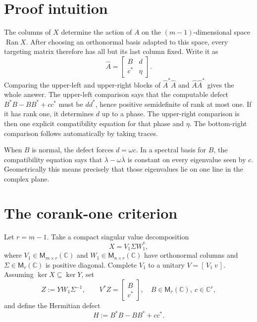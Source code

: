 \documentclass[11pt]{article}
\newcommand{\C}{\mathbb C}
\newcommand{\M}{\mathsf M}
\newcommand{\Ran}{\operatorname{Ran}}
\begin{document}
\section{Proof intuition}

The columns of $X$ determine the action of $A$ on the $(m-1)$-dimensional
space $\Ran X$.  After choosing an orthonormal basis adapted to this space,
every targeting matrix therefore has all but its last column fixed.  Write it
as
\[
 \widehat A=\begin{bmatrix}B&d\\ c^*&\eta\end{bmatrix}.
\]
Comparing the upper-left and upper-right blocks of
$\widehat A^*\widehat A$ and $\widehat A\widehat A^*$ gives the whole answer.
The upper-left comparison says that the computable defect
$B^*B-BB^*+cc^*$ must be $dd^*$, hence positive semidefinite of rank at most
one.  If it has rank one, it determines $d$ up to a phase.  The upper-right
comparison is then one explicit compatibility equation for that phase and
$\eta$.  The bottom-right comparison follows automatically by taking traces.

When $B$ is normal, the defect forces $d=\omega c$.  In a spectral basis for
$B$, the compatibility equation says that
$\lambda-\omega\overline\lambda$ is constant on every eigenvalue seen by
$c$.  Geometrically this means precisely that those eigenvalues lie on one
line in the complex plane.

\section{The corank-one criterion}

Let $r=m-1$.  Take a compact singular value decomposition
\[
 X=V_1\Sigma W_1^*,
\]
where $V_1\in\M_{m\times r}(\C)$ and
$W_1\in\M_{n\times r}(\C)$ have orthonormal columns and
$\Sigma\in\M_r(\C)$ is positive diagonal.  Complete $V_1$ to a unitary
$V=[\,V_1\ v\,]$.  Assuming $\ker X\subseteq\ker Y$, set
\[
 Z:=YW_1\Sigma^{-1},\qquad
 V^*Z=\begin{bmatrix}B\\c^*\end{bmatrix},
 \quad B\in\M_r(\C),\ c\in\C^r,
\]
and define the Hermitian defect
\[
 H:=B^*B-BB^*+cc^*.
\]
\end{document}
